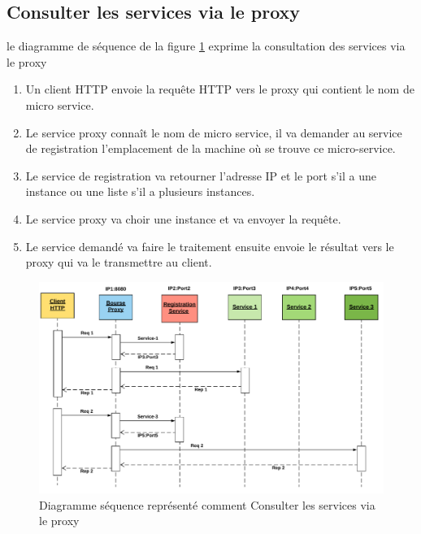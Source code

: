       \subsection{Consulter les services via le proxy }
    le diagramme de séquence de la figure \ref{fig:secance}   exprime  la  consultation des services via le proxy 
    \begin{enumerate}
    	
    	\item Un client HTTP envoie la requête HTTP vers le proxy qui contient le nom de micro service.  
    	
  
    	
    		\item  Le service proxy connaît le nom de micro service, il va demander au service de registration l'emplacement de la machine où se trouve ce micro-service. 
    
    	\item Le service de registration  va retourner l'adresse IP et le port s'il a une instance ou  une liste s'il a  plusieurs instances.
    	
    	\item  Le service proxy va choir une instance et  va envoyer la requête.  
    	
    	\item  Le service demandé va faire le traitement ensuite envoie le résultat vers le proxy qui va le transmettre au client. 
    \end{enumerate}
    
    
    \begin{figure}[H]
    	\centering
    	\includegraphics[width=0.7\linewidth]{images/secance}
    	\caption{Diagramme séquence représenté comment  Consulter les services via le proxy}
    	\label{fig:secance}
    \end{figure}
    
    
    
    
    
